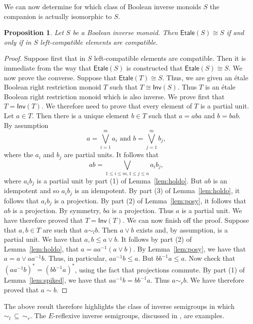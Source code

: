 \documentclass[a4paper]{amsart}
\newtheorem{proposition}[theorem]{Proposition}
\begin{document}
We can now determine for which class of Boolean inverse monoids $S$ the companion is actually isomorphic to $S$.

\begin{proposition} Let $S$ be a Boolean inverse monoid.
Then $\mathsf{Etale}(S) \cong S$ if and only if in $S$ left-compatible elements are compatible.
\end{proposition}
\begin{proof} Suppose first that in $S$ left-compatible elements are compatible.
Then it is immediate from the way that $\mathsf{Etale}(S)$ is constructed that
$\mathsf{Etale}(S) \cong S$. 
We now prove the converse.
Suppose that $\mathsf{Etale}(T) \cong S$.
Thus, we are given an \'etale Boolean right restriction monoid $T$ such that
$T \cong \mathsf{Inv}(S)$.
Thus $T$ is an  \'etale Boolean right restriction monoid which is also inverse.
We prove first that $T = \mathsf{Inv}(T)$.
We therefore need to prove that every element of $T$ is a partial unit.
Let $a \in T$.
Then there is a unique element $b \in T$ such that
$a = aba$ and $b = bab$.
By assumption
$$a = \bigvee_{i=1}^{m} a_{i} \text{ and } b = \bigvee_{j=1}^{m} b_{j},$$
where the $a_{i}$ and $b_{j}$ are partial units.
It follows that
$$ab =  \bigvee_{1 \leq i \leq m, 1 \leq j \leq n} a_{i}b_{j},$$
where $a_{i}b_{j}$ is a partial unit by part (1) of Lemma~\ref{lem:holdo}.
But $ab$ is an idempotent and so $a_{i}b_{j}$ is an idempotent.
By part (3) of  Lemma~\ref{lem:holdo}, it follows that  $a_{i}b_{j}$ 
is a projection. 
By part (2) of Lemma~\ref{lem:posy}, it follows that $ab$ is a projection.
By symmetry, $ba$ is a projection.
Thus $a$ is a partial unit.
We have therefore proved that $T = \mathsf{Inv}(T)$.
We can now finish off the proof.
Suppose that $a,b \in T$ are such that $a \sim_{l} b$.
Then $a \vee b$ exists and, by assumption, is a partial unit.
We have that $a,b \leq a \vee b$.
It follows by part (2) of Lemma~\ref{lem:holdo}, that
$a = aa^{-1}(a \vee b)$.
By Lemma~\ref{lem:posy}, we have that
$a = a \vee aa^{-1}b$.
Thus, in particular, $aa^{-1}b \leq a$.
But $bb^{-1}a \leq a$.
Now check that $(aa^{-1}b)^{\ast} = (bb^{-1}a)^{\ast}$,
using the fact that projections commute.
By part (1) of Lemma~\ref{lem:spiked}, we have that $aa^{-1}b = bb^{-1}a$.
Thus $a \sim_{r} b$.
We have therefore proved that $a \sim b$.
\end{proof}

The above result therefore highlights the class of inverse semigroups in which $\sim_{l} \, \subseteq \, \sim_{r}$.
The $E$-reflexive inverse semigroups, discussed in \cite[page 86]{Lawson1998}, are examples.
\end{document}
